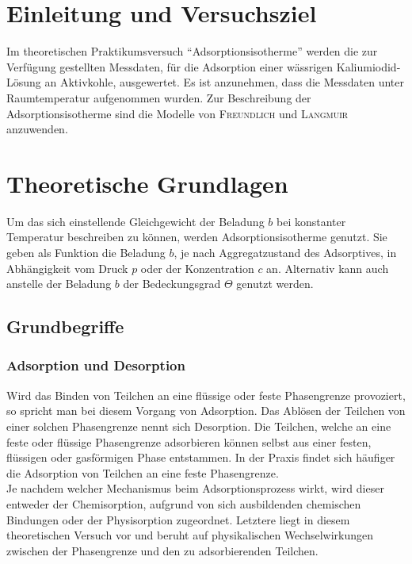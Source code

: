 \section{Einleitung und Versuchsziel}
\label{sec:aufgabenstellung}

Im theoretischen Praktikumsversuch "`Adsorptionsisotherme"' werden die zur Verfügung gestellten Messdaten, für die Adsorption einer wässrigen Kaliumiodid-Lösung   an Aktivkohle, ausgewertet. Es ist anzunehmen, dass die Messdaten unter Raumtemperatur aufgenommen wurden. Zur Beschreibung der Adsorptionsisotherme sind die Modelle von \textsc{Freundlich} und \textsc{Langmuir} anzuwenden.

\section*{Theoretische Grundlagen}
Um das sich einstellende Gleichgewicht der Beladung $b$ bei konstanter Temperatur beschreiben zu können, werden Adsorptionsisotherme genutzt. Sie geben als Funktion die Beladung $b$, je nach Aggregatzustand des Adsorptives, in Abhängigkeit vom Druck $p$ oder der Konzentration $c$ an. Alternativ kann auch anstelle der Beladung $b$ der Bedeckungsgrad $\Theta$ genutzt werden.

\subsection*{Grundbegriffe \cite{prakti}}
\subsubsection*{Adsorption und Desorption}
Wird das Binden von Teilchen an eine flüssige oder feste Phasengrenze provoziert, so spricht man bei diesem Vorgang von Adsorption. Das Ablösen der Teilchen von einer solchen Phasengrenze nennt sich Desorption. Die Teilchen, welche an eine feste oder flüssige Phasengrenze adsorbieren können selbst aus einer festen, flüssigen oder gasförmigen Phase entstammen. In der Praxis findet sich häufiger die Adsorption von Teilchen an eine feste Phasengrenze.\\
Je nachdem welcher Mechanismus beim Adsorptionsprozess wirkt, wird dieser entweder der Chemisorption, aufgrund von sich ausbildenden chemischen Bindungen oder der Physisorption zugeordnet. Letztere liegt in diesem theoretischen Versuch vor und beruht auf physikalischen Wechselwirkungen zwischen der Phasengrenze und den zu adsorbierenden Teilchen.

